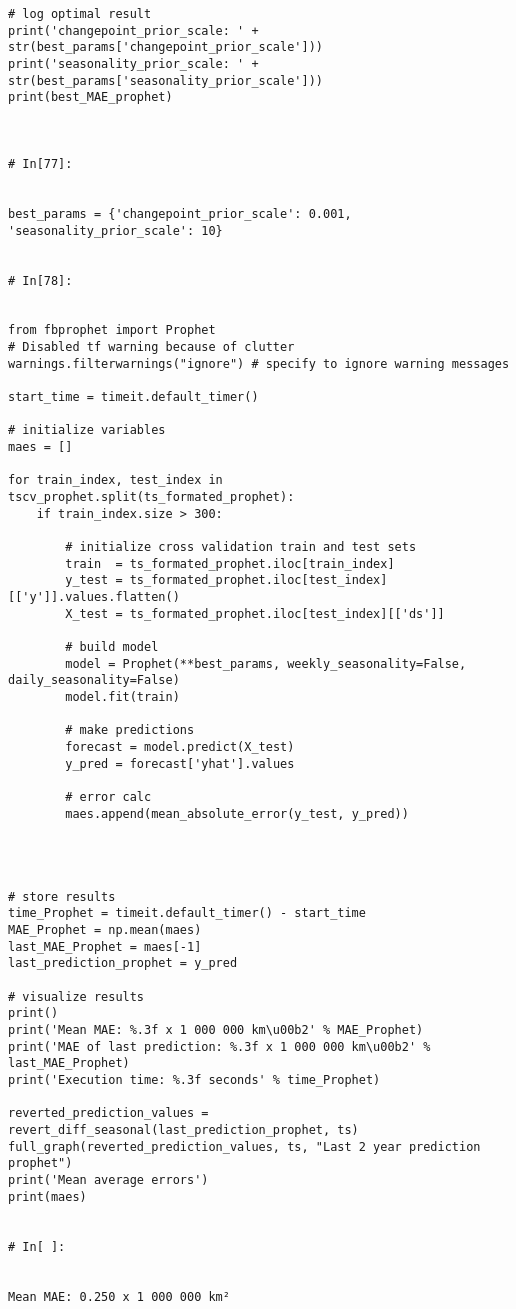 \begin{verbatim}
# log optimal result          
print('changepoint_prior_scale: ' + str(best_params['changepoint_prior_scale']))
print('seasonality_prior_scale: ' + str(best_params['seasonality_prior_scale']))
print(best_MAE_prophet)
            


# In[77]:


best_params = {'changepoint_prior_scale': 0.001, 'seasonality_prior_scale': 10}


# In[78]:


from fbprophet import Prophet
# Disabled tf warning because of clutter
warnings.filterwarnings("ignore") # specify to ignore warning messages

start_time = timeit.default_timer()

# initialize variables
maes = []

for train_index, test_index in tscv_prophet.split(ts_formated_prophet):
    if train_index.size > 300:  
        
        # initialize cross validation train and test sets
        train  = ts_formated_prophet.iloc[train_index]
        y_test = ts_formated_prophet.iloc[test_index][['y']].values.flatten()
        X_test = ts_formated_prophet.iloc[test_index][['ds']]

        # build model
        model = Prophet(**best_params, weekly_seasonality=False, daily_seasonality=False)
        model.fit(train)

        # make predictions
        forecast = model.predict(X_test)
        y_pred = forecast['yhat'].values

        # error calc
        maes.append(mean_absolute_error(y_test, y_pred))

        


# store results
time_Prophet = timeit.default_timer() - start_time
MAE_Prophet = np.mean(maes)
last_MAE_Prophet = maes[-1]
last_prediction_prophet = y_pred

# visualize results
print()
print('Mean MAE: %.3f x 1 000 000 km\u00b2' % MAE_Prophet)
print('MAE of last prediction: %.3f x 1 000 000 km\u00b2' % last_MAE_Prophet)
print('Execution time: %.3f seconds' % time_Prophet)

reverted_prediction_values = revert_diff_seasonal(last_prediction_prophet, ts)
full_graph(reverted_prediction_values, ts, "Last 2 year prediction prophet")
print('Mean average errors')
print(maes)


# In[ ]:


Mean MAE: 0.250 x 1 000 000 km²



\end{verbatim}
